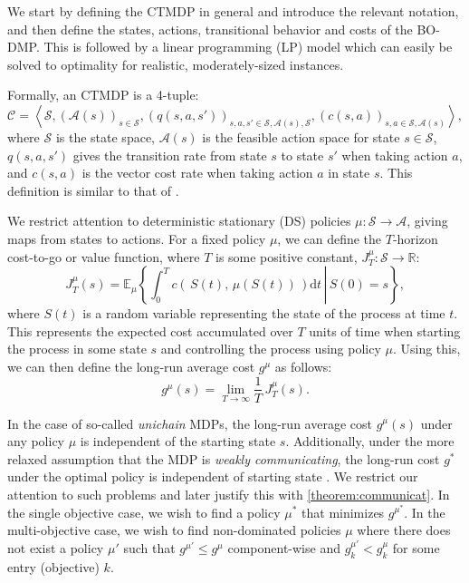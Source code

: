\documentclass[11pt,authoryear,a4paper]{article}
\newcommand{\RR}{\mathbb{R}}
\newcommand{\EE}{\mathbb{E}}
\theoremstyle{definition}
\begin{document}
We start by defining the CTMDP in general and introduce the relevant notation, and then define the states, actions, transitional behavior and costs of the BO-DMP. This is followed by a linear programming (LP) model which can easily be solved to optimality for realistic, moderately-sized instances.

Formally, an CTMDP is a 4-tuple:$$\mathcal{C} = \left\langle \mathcal{S}, (\mathcal{A}(s))_{s\in\mathcal{S}}, \left(q(s,a,s')\right)_{s,a,s'\in \mathcal{S},\mathcal{A}(s),\mathcal{S}}, \left(c(s,a)\right)_{s,a\in \mathcal{S},\mathcal{A}(s)}  \right\rangle,$$
where $\mathcal{S}$ is the state space, $\mathcal{A}(s)$ is the feasible action space for state $s\in\mathcal S$, $q(s,a,s')$ gives the transition rate from state $s$ to state $s'$ when taking action $a$, and $c(s,a)$ is the vector cost rate when taking action $a$ in state $s$. This definition is similar to that of \cite{Puterman1994MarkovDP}.

We restrict attention to deterministic stationary (DS) policies $\mu:\mathcal{S}\to\mathcal{A}$, giving maps from states to actions. For a fixed policy $\mu$, we can define the $T$-horizon cost-to-go or value function, where $T$ is some positive constant, $J^\mu_T : \mathcal{S}\to\RR$:
$$J_T^\mu(s) = \EE_\mu\left\{\left.\int_0^T c\left(\,S(t),\,\mu(S(t))\,\right) \text{d}t\,\right|\,S(0) = s\right \},$$
where $S(t)$ is a random variable representing the state of the process at time $t$. This represents the expected cost accumulated over $T$ units of time when starting the process in some state $s$ and controlling the process using policy $\mu$. Using this, we can then define the long-run average cost $g^\mu$ as follows:
$$g^\mu(s) = \lim_{T\to\infty} \frac{1}{T}\,J_T^\mu(s).$$

In the case of so-called \emph{unichain} MDPs, the long-run average cost $g^\mu(s)$ under any policy $\mu$ is independent of the starting state $s$. Additionally, under the more relaxed assumption that the MDP is \emph{weakly communicating}, the long-run cost $g^*$ under the optimal policy is independent of starting state \citep{Puterman1994MarkovDP}. We restrict our attention to such problems and later justify this with \autoref{theorem:communicat}. In the single objective case, we wish to find a policy $\mu^*$ that minimizes $g^{\mu^*}$. In the multi-objective case, we wish to find non-dominated policies $\mu$ where there does not exist a policy $\mu'$ such that $g^{\mu'} \leq g^{\mu}$ component-wise and $g^{\mu'}_k < g^{\mu}_k$ for some entry (objective) $k$. 
\end{document}
